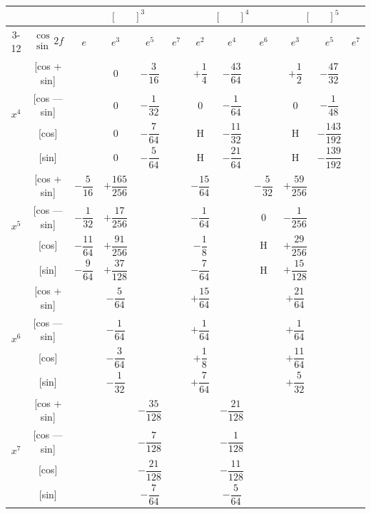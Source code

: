\documentclass[11pt,a4paper]{book}
\begin{document}
{{\newpage


\begin{center}
\small
\begin{tabular}{|c|c|c|c|c|c|c|c|c|c|c|c|}
\hline
& & \multicolumn{4}{c|}{$[\phantom{()}]^3$} & \multicolumn{3}{c|}{$[\phantom{()}]^4$} & \multicolumn{3}{c|}{$[\phantom{()}]^5$} \\
\cline{3-12}
& $\begin{smallmatrix} \cos \\ \sin \end{smallmatrix} 2f$ & $e$ & $e^3$ & $e^5$ & $e^7$ & $e^2$ & $e^4$ & $e^6$ & $e^3$ & $e^5$ & $e^7$ \\
\hline
\multirow{4}{*}{$x^4$} & [cos + sin] & & $0$ & $-\dfrac{3}{16}$ & & $+\dfrac{1}{4}$ & $-\dfrac{43}{64}$ & & $+\dfrac{1}{2}$ & $-\dfrac{47}{32}$ \\
& [cos --- sin] & & $0$ & $-\dfrac{1}{32}$ & & $0$ & $-\dfrac{1}{64}$ & & $0$ & $-\dfrac{1}{48}$ \\
& [cos] & & $0$ & $-\dfrac{7}{64}$ & & H & $-\dfrac{11}{32}$ & & H & $-\dfrac{143}{192}$ \\
& [sin] & & $0$ & $-\dfrac{5}{64}$ & & H & $-\dfrac{21}{64}$ & & H & $-\dfrac{139}{192}$ \\
\hline
\multirow{4}{*}{$x^5$} & [cos + sin] & $-\dfrac{5}{16}$ & $+\dfrac{165}{256}$ & & & $-\dfrac{15}{64}$ & & $-\dfrac{5}{32}$ & $+\dfrac{59}{256}$ \\
& [cos --- sin] & $-\dfrac{1}{32}$ & $+\dfrac{17}{256}$ & & & $-\dfrac{1}{64}$ & & $0$ & $-\dfrac{1}{256}$ \\
& [cos] & $-\dfrac{11}{64}$ & $+\dfrac{91}{256}$ & & & $-\dfrac{1}{8}$ & & H & $+\dfrac{29}{256}$ \\
& [sin] & $-\dfrac{9}{64}$ & $+\dfrac{37}{128}$ & & & $-\dfrac{7}{64}$ & & H & $+\dfrac{15}{128}$ \\
\hline
\multirow{4}{*}{$x^6$} & [cos + sin] & & $-\dfrac{5}{64}$ & & & $+\dfrac{15}{64}$ & & & $+\dfrac{21}{64}$ \\
& [cos --- sin] & & $-\dfrac{1}{64}$ & & & $+\dfrac{1}{64}$ & & & $+\dfrac{1}{64}$ \\
& [cos] & & $-\dfrac{3}{64}$ & & & $+\dfrac{1}{8}$ & & & $+\dfrac{11}{64}$ \\
& [sin] & & $-\dfrac{1}{32}$ & & & $+\dfrac{7}{64}$ & & & $+\dfrac{5}{32}$ \\
\hline
\multirow{4}{*}{$x^7$} & [cos + sin] & & & $-\dfrac{35}{128}$ & & & $-\dfrac{21}{128}$ \\
& [cos --- sin] & & & $-\dfrac{7}{128}$ & & & $-\dfrac{1}{128}$ \\
& [cos] & & & $-\dfrac{21}{128}$ & & & $-\dfrac{11}{128}$ \\
& [sin] & & & $-\dfrac{7}{64}$ & & & $-\dfrac{5}{64}$ \\
\hline
\end{tabular}
\end{center}

}}
\end{document}
